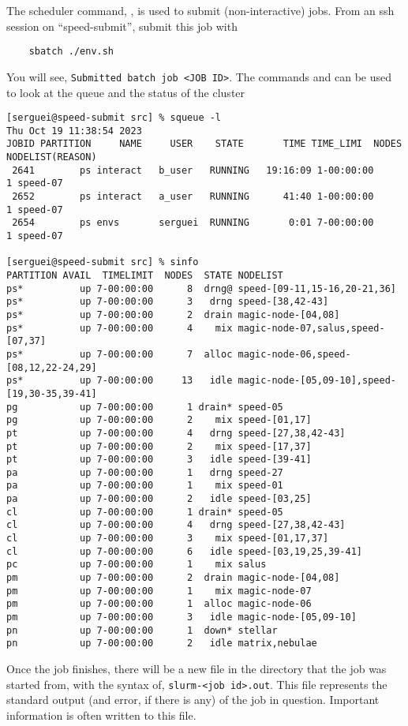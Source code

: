 \noindent The scheduler command, , is used to submit (non-interactive) jobs.
From an ssh session on ``speed-submit'', submit this job with
\begin{verbatim}
    sbatch ./env.sh
\end{verbatim}

\noindent You will see, \texttt{Submitted batch job <JOB ID>}.
The commands  and  can be used to look at the queue and the status of the cluster

\small
\begin{verbatim}
[serguei@speed-submit src] % squeue -l
Thu Oct 19 11:38:54 2023
JOBID PARTITION     NAME     USER    STATE       TIME TIME_LIMI  NODES NODELIST(REASON)
 2641        ps interact   b_user   RUNNING   19:16:09 1-00:00:00      1 speed-07
 2652        ps interact   a_user   RUNNING      41:40 1-00:00:00      1 speed-07
 2654        ps envs       serguei  RUNNING       0:01 7-00:00:00      1 speed-07

[serguei@speed-submit src] % sinfo
PARTITION AVAIL  TIMELIMIT  NODES  STATE NODELIST
ps*          up 7-00:00:00      8  drng@ speed-[09-11,15-16,20-21,36]
ps*          up 7-00:00:00      3   drng speed-[38,42-43]
ps*          up 7-00:00:00      2  drain magic-node-[04,08]
ps*          up 7-00:00:00      4    mix magic-node-07,salus,speed-[07,37]
ps*          up 7-00:00:00      7  alloc magic-node-06,speed-[08,12,22-24,29]
ps*          up 7-00:00:00     13   idle magic-node-[05,09-10],speed-[19,30-35,39-41]
pg           up 7-00:00:00      1 drain* speed-05
pg           up 7-00:00:00      2    mix speed-[01,17]
pt           up 7-00:00:00      4   drng speed-[27,38,42-43]
pt           up 7-00:00:00      2    mix speed-[17,37]
pt           up 7-00:00:00      3   idle speed-[39-41]
pa           up 7-00:00:00      1   drng speed-27
pa           up 7-00:00:00      1    mix speed-01
pa           up 7-00:00:00      2   idle speed-[03,25]
cl           up 7-00:00:00      1 drain* speed-05
cl           up 7-00:00:00      4   drng speed-[27,38,42-43]
cl           up 7-00:00:00      3    mix speed-[01,17,37]
cl           up 7-00:00:00      6   idle speed-[03,19,25,39-41]
pc           up 7-00:00:00      1    mix salus
pm           up 7-00:00:00      2  drain magic-node-[04,08]
pm           up 7-00:00:00      1    mix magic-node-07
pm           up 7-00:00:00      1  alloc magic-node-06
pm           up 7-00:00:00      3   idle magic-node-[05,09-10]
pn           up 7-00:00:00      1  down* stellar
pn           up 7-00:00:00      2   idle matrix,nebulae
\end{verbatim}
\normalsize

Once the job finishes, there will be a new file in the directory that the job was started from,
with the syntax of, \texttt{slurm-<job id>.out}. This file represents the standard output
(and error, if there is any) of the job in question.
Important information is often written to this file.
%
